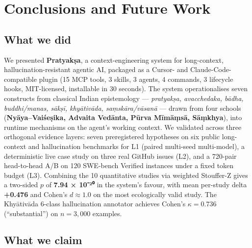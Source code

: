 \section{Conclusions and Future Work}\label{conclusions-and-future-work}

\subsection{What we did}\label{what-we-did}

We presented \textbf{Pratyakṣa}, a context-engineering system for long-context, hallucination-resistant agentic AI, packaged as a Cursor- and Claude-Code-compatible plugin (15 MCP tools, 3 skills, 3 agents, 4 commands, 3 lifecycle hooks, MIT-licensed, installable in 30 seconds). The system operationalises seven constructs from classical Indian epistemology --- \emph{pratyakṣa, avacchedaka, bādha, buddhi/manas, sākṣī, khyātivāda, saṃskāra/vāsanā} --- drawn from four schools (\textbf{Nyāya--Vaiśeṣika, Advaita Vedānta, Pūrva Mīmāṃsā, Sāṃkhya}), into runtime mechanisms on the agent's working context. We validated across three orthogonal evidence layers: seven preregistered hypotheses on six public long-context and hallucination benchmarks for L1 (paired multi-seed multi-model), a deterministic live case study on three real GitHub issues (L2), and a 720-pair head-to-head A/B on 120 SWE-bench Verified instances under a fixed token budget (L3). Combining the 10 quantitative studies via weighted Stouffer-Z gives a two-sided \(p\) of \textbf{7.94 × 10⁻²⁰} in the system's favour, with mean per-study delta \textbf{+0.476} and Cohen's \(d \approx \mathbf{1.0}\) on the most ecologically valid study. The Khyātivāda 6-class hallucination annotator achieves Cohen's \(\kappa = \mathbf{0.736}\) (``substantial'') on \(n = 3{,}000\) examples.

\subsection{What we claim}\label{what-we-claim}

